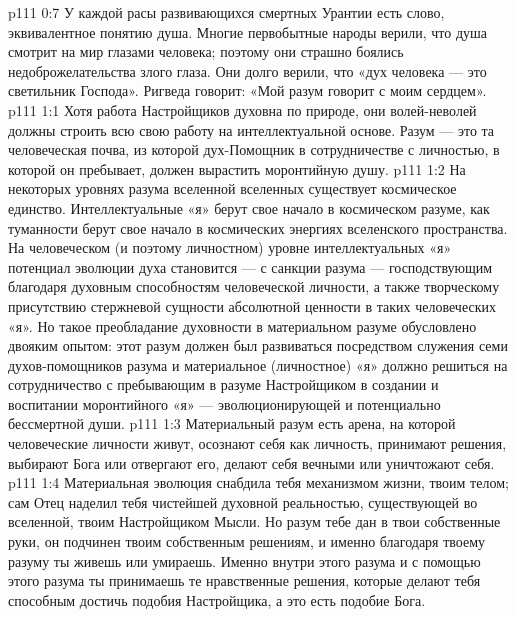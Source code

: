 \vs p111 0:7 У каждой расы развивающихся смертных Урантии есть слово, эквивалентное понятию душа. Многие первобытные народы верили, что душа смотрит на мир глазами человека; поэтому они страшно боялись недоброжелательства злого глаза. Они долго верили, что «дух человека --- это светильник Господа». Ригведа говорит: «Мой разум говорит с моим сердцем».
\vs p111 1:1 Хотя работа Настройщиков духовна по природе, они волей\hyp{}неволей должны строить всю свою работу на интеллектуальной основе. Разум --- это та человеческая почва, из которой дух\hyp{}Помощник в сотрудничестве с личностью, в которой он пребывает, должен вырастить моронтийную душу.
\vs p111 1:2 На некоторых уровнях разума вселенной вселенных существует космическое единство. Интеллектуальные «я» берут свое начало в космическом разуме, как туманности берут свое начало в космических энергиях вселенского пространства. На человеческом (и поэтому личностном) уровне интеллектуальных «я» потенциал эволюции духа становится --- с санкции разума --- господствующим благодаря духовным способностям человеческой личности, а также творческому присутствию стержневой сущности абсолютной ценности в таких человеческих «я». Но такое преобладание духовности в материальном разуме обусловлено двояким опытом: этот разум должен был развиваться посредством служения семи духов\hyp{}помощников разума и материальное (личностное) «я» должно решиться на сотрудничество с пребывающим в разуме Настройщиком в создании и воспитании моронтийного «я» --- эволюционирующей и потенциально бессмертной души.
\vs p111 1:3 \pc Материальный разум есть арена, на которой человеческие личности живут, осознают себя как личность, принимают решения, выбирают Бога или отвергают его, делают себя вечными или уничтожают себя.
\vs p111 1:4 \pc Материальная эволюция снабдила тебя механизмом жизни, твоим телом; сам Отец наделил тебя чистейшей духовной реальностью, существующей во вселенной, твоим Настройщиком Мысли. Но разум тебе дан в твои собственные руки, он подчинен твоим собственным решениям, и именно благодаря твоему разуму ты живешь или умираешь. Именно внутри этого разума и с помощью этого разума ты принимаешь те нравственные решения, которые делают тебя способным достичь подобия Настройщика, а это есть подобие Бога.
